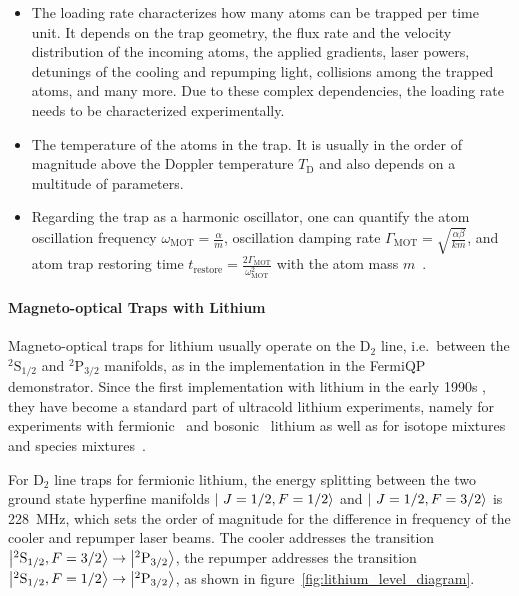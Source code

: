 \begin{itemize}
    \item The loading rate characterizes how many atoms can be trapped per time unit. It depends on the trap geometry, the flux rate and the velocity distribution of the incoming atoms, the applied gradients, laser powers, detunings of the cooling and repumping light, collisions among the trapped atoms, and many more. Due to these complex dependencies, the loading rate needs to be characterized experimentally.
    \item The temperature of the atoms in the trap. It is usually in the order of magnitude above the Doppler temperature $T_\text{D}$ and also depends on a multitude of parameters.
    \item Regarding the trap as a harmonic oscillator, one can quantify the atom oscillation frequency $\omega_\text{MOT} = \frac{\alpha}{m}$, oscillation damping rate $\Gamma_\text{MOT} = \sqrt{\frac{\alpha \beta}{km}}$, and atom trap restoring time $t_\text{restore} = \frac{2\Gamma_\text{MOT}}{\omega_\text{MOT}^2}$ with the atom mass $m$~\cite{metcalf_laser_1999}.
\end{itemize}

\paragraph{Magneto-optical Traps with Lithium}\label{ch:3d_mots_with_li}
Magneto-optical traps for lithium usually operate on the D$_2$ line, i.e.~between the $^2\text{S}_{1/2}$ and $^2\text{P}_{3/2}$ manifolds, as in the implementation in the FermiQP demonstrator. Since the first implementation with lithium in the early 1990s \cite{kawanaka_decay_1993}, they have become a standard part of ultracold lithium experiments, namely for experiments with fermionic~\cite{duarte_all-optical_2011,omran_microscopic_2015} and bosonic~\cite{kawanaka_decay_1993,schunemann_magneto-optic_1998} lithium as well as for isotope mixtures \cite{mewes_simultaneous_1999, schreck_sympathetic_2001, hilker_laser_2012, kerkmann_novel_2019} and species mixtures~\cite{ladouceur_compact_2009,tiecke_high-flux_2009,chen_lithium-cesium_2021}.

For D$_2$ line traps for fermionic lithium, the energy splitting between the two ground state hyperfine manifolds $\Ket{~J=1/2, F=1/2}$ and $\Ket{~J=1/2, F=3/2}$ is \SI{228}{\mega\hertz}, which sets the order of magnitude for the difference in frequency of the cooler and repumper laser beams. The cooler addresses the transition $\Ket{^2\text{S}_{1/2}, F = 3/2} \rightarrow \Ket{^2\text{P}_{3/2}}$, the repumper addresses the transition $\Ket{^2\text{S}_{1/2}, F = 1/2} \rightarrow \Ket{^2\text{P}_{3/2}}$, as shown in figure~\ref{fig:lithium_level_diagram}.

